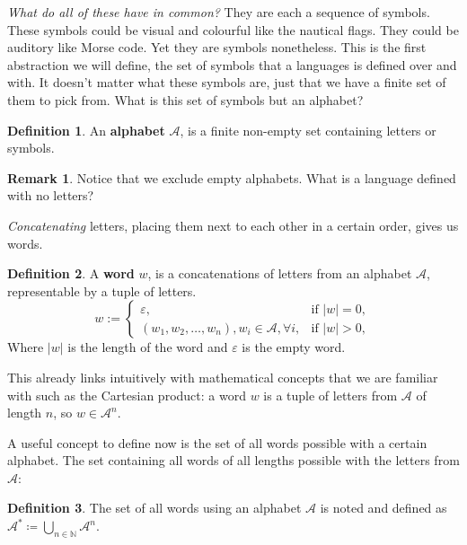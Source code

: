 \documentclass[a4paper]{article}
\theoremstyle{definition}
\newtheorem{definition}{Definition}[section]
\theoremstyle{definition}
\theoremstyle{definition}
\newtheorem{remark}{Remark}[section]
\begin{document}
\emph{What do all of these have in common?} They are each a sequence of symbols. These symbols could be visual and colourful like the nautical flags. They could be auditory like Morse code. Yet they are symbols nonetheless. This is the first abstraction we will define, the set of symbols that a languages is defined over and with. It doesn't matter what these symbols are, just that we have a finite set of them to pick from. What is this set of symbols but an alphabet?

\newcommand{\alphabet}{\mathcal{A}}
\begin{definition}
    \label{def:alphabet}
    An \textbf{alphabet} $\alphabet$, is a finite non-empty set containing letters or symbols.
\end{definition}

\begin{remark} Notice that we exclude empty alphabets. What is a language defined with no letters?
\end{remark}

\emph{Concatenating} letters, placing them next to each other in a certain order, gives us words.

\newcommand{\emptyWord}{\varepsilon}
\begin{definition}
    \label{def:word}
    A \textbf{word} $w$, is a concatenations of letters from an alphabet $\alphabet$, representable by a tuple of letters.
    \[
    w := 
    \begin{cases}
        \emptyWord, & \text{if } |w| = 0, \\
        (w_1, w_2, \dots, w_n), w_i \in \alphabet,
        \forall i, & \text{if } |w| > 0,
    \end{cases}
    \]
    Where $|w|$ is the length of the word and $\emptyWord$ is the empty word.
\end{definition}

This already links intuitively with mathematical concepts that we are familiar with such as the Cartesian product: a word $w$ is a tuple of letters from $\alphabet$ of length $n$, so $w \in \alphabet^n$.

A useful concept to define now is the set of all words possible with a certain alphabet. The set containing all words of all lengths possible with the letters from $\alphabet$:

\begin{definition}
    \label{def:aStar}
    The set of all words using an alphabet $\alphabet$ is noted and defined as $\alphabet^* \coloneqq \bigcup\limits_{n \in \mathbb{N}} \alphabet^n$.
\end{definition}
\end{document}

